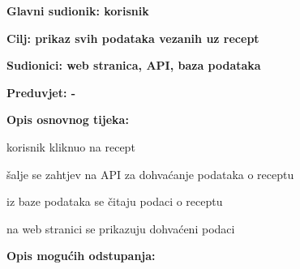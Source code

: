 					\noindent {}
					\begin{packed_item}
						\item \textbf{Glavni sudionik: korisnik}
						\item  \textbf{Cilj: prikaz svih podataka vezanih uz recept}
						\item  \textbf{Sudionici: web stranica, API, baza podataka}
						\item  \textbf{Preduvjet: -}
						
						\item  \textbf{Opis osnovnog tijeka:}
						\item[] \begin{packed_enum}
							\item korisnik kliknuo na recept
							\item šalje se zahtjev na API za dohvaćanje podataka o receptu
							\item iz baze podataka se čitaju podaci o receptu
							\item na web stranici se prikazuju dohvaćeni podaci
						\end{packed_enum}
						
						\item  \textbf{Opis mogućih odstupanja:}
						\item[] \begin{packed_item}							
						\end{packed_item}
					\end{packed_item}
					
					
					
